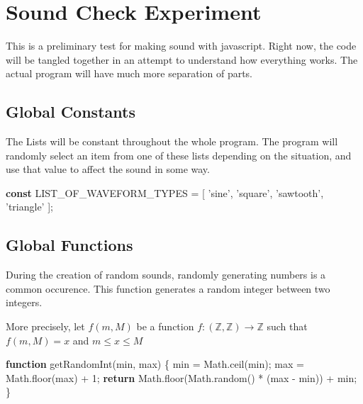 \documentclass[]{article}
\date{}
\newenvironment{Shaded}{}{}
\newcommand{\KeywordTok}[1]{\textcolor[rgb]{0.00,0.44,0.13}{\textbf{#1}}}
\newcommand{\DecValTok}[1]{\textcolor[rgb]{0.25,0.63,0.44}{#1}}
\newcommand{\StringTok}[1]{\textcolor[rgb]{0.25,0.44,0.63}{#1}}
\newcommand{\VariableTok}[1]{\textcolor[rgb]{0.10,0.09,0.49}{#1}}
\newcommand{\ControlFlowTok}[1]{\textcolor[rgb]{0.00,0.44,0.13}{\textbf{#1}}}
\newcommand{\OperatorTok}[1]{\textcolor[rgb]{0.40,0.40,0.40}{#1}}
\newcommand{\AttributeTok}[1]{\textcolor[rgb]{0.49,0.56,0.16}{#1}}
\newcommand{\NormalTok}[1]{#1}
\begin{document}
\section{Sound Check Experiment}\label{sound-check-experiment}

This is a preliminary test for making sound with javascript. Right now,
the code will be tangled together in an attempt to understand how
everything works. The actual program will have much more separation of
parts.

\subsection{Global Constants}\label{global-constants}

The Lists will be constant throughout the whole program. The program
will randomly select an item from one of these lists depending on the
situation, and use that value to affect the sound in some way.

\begin{Shaded}
\begin{Highlighting}[]
\KeywordTok{const}\NormalTok{ LIST_OF_WAVEFORM_TYPES }\OperatorTok{=}\NormalTok{ [}
    \StringTok{'sine'}\OperatorTok{,} \StringTok{'square'}\OperatorTok{,} \StringTok{'sawtooth'}\OperatorTok{,} \StringTok{'triangle'}
\NormalTok{]}\OperatorTok{;}
\end{Highlighting}
\end{Shaded}

\subsection{Global Functions}\label{global-functions}

During the creation of random sounds, randomly generating numbers is a
common occurence. This function generates a random integer between two
integers.

More precisely, let \(f(m,M)\) be a function
\(f:(\mathbb{Z}, \mathbb{Z}) \to \mathbb{Z}\) such that \(f(m,M) = x\)
and \(m \leq x \leq M\)

\begin{Shaded}
\begin{Highlighting}[]
\KeywordTok{function} \AttributeTok{getRandomInt}\NormalTok{(min}\OperatorTok{,}\NormalTok{ max) }\OperatorTok{\{}
\NormalTok{    min }\OperatorTok{=} \VariableTok{Math}\NormalTok{.}\AttributeTok{ceil}\NormalTok{(min)}\OperatorTok{;}
\NormalTok{    max }\OperatorTok{=} \VariableTok{Math}\NormalTok{.}\AttributeTok{floor}\NormalTok{(max) }\OperatorTok{+} \DecValTok{1}\OperatorTok{;}
    \ControlFlowTok{return} \VariableTok{Math}\NormalTok{.}\AttributeTok{floor}\NormalTok{(}\VariableTok{Math}\NormalTok{.}\AttributeTok{random}\NormalTok{() }\OperatorTok{*}\NormalTok{ (max }\OperatorTok{-}\NormalTok{ min)) }\OperatorTok{+}\NormalTok{ min}\OperatorTok{;}
\OperatorTok{\}}
\end{Highlighting}
\end{Shaded}
\end{document}
